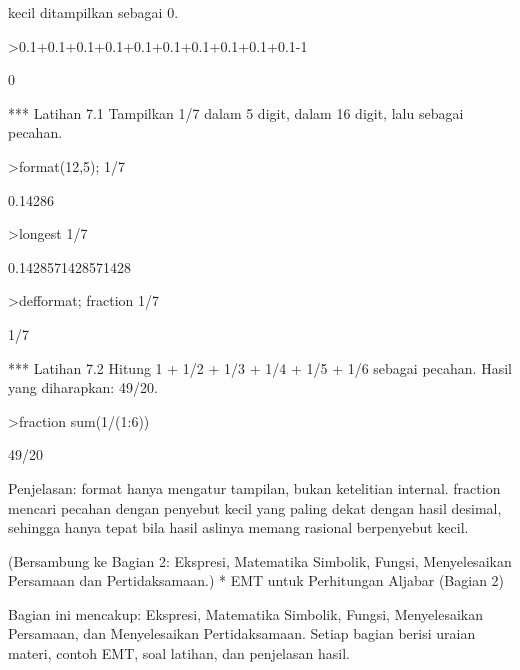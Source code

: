 \documentclass[a4paper,10pt]{article}
\begin{document}
\begin{eulernotebook}
\begin{eulercomment}
kecil ditampilkan sebagai 0.
\end{eulercomment}
\begin{eulerprompt}
>0.1+0.1+0.1+0.1+0.1+0.1+0.1+0.1+0.1+0.1-1
\end{eulerprompt}
\begin{euleroutput}
  0
\end{euleroutput}
\begin{eulercomment}
*** Latihan 7.1
Tampilkan 1/7 dalam 5 digit, dalam 16 digit, lalu sebagai pecahan.
\end{eulercomment}
\begin{eulerprompt}
>format(12,5); 1/7
\end{eulerprompt}
\begin{euleroutput}
      0.14286 
\end{euleroutput}
\begin{eulerprompt}
>longest 1/7
\end{eulerprompt}
\begin{euleroutput}
       0.1428571428571428 
\end{euleroutput}
\begin{eulerprompt}
>defformat; fraction 1/7
\end{eulerprompt}
\begin{euleroutput}
  1/7
\end{euleroutput}
\begin{eulercomment}
*** Latihan 7.2
Hitung 1 + 1/2 + 1/3 + 1/4 + 1/5 + 1/6 sebagai pecahan.
Hasil yang diharapkan: 49/20.
\end{eulercomment}
\begin{eulerprompt}
>fraction sum(1/(1:6))
\end{eulerprompt}
\begin{euleroutput}
  49/20
\end{euleroutput}
\begin{eulercomment}
Penjelasan: format hanya mengatur tampilan, bukan ketelitian internal.
fraction mencari pecahan dengan penyebut kecil yang paling dekat dengan
hasil desimal, sehingga hanya tepat bila hasil aslinya memang rasional
berpenyebut kecil.

(Bersambung ke Bagian 2: Ekspresi, Matematika Simbolik, Fungsi,
Menyelesaikan Persamaan dan Pertidaksamaan.)
* EMT untuk Perhitungan Aljabar (Bagian 2)

Bagian ini mencakup: Ekspresi, Matematika Simbolik, Fungsi, Menyelesaikan
Persamaan, dan Menyelesaikan Pertidaksamaan. Setiap bagian berisi uraian
materi, contoh EMT, soal latihan, dan penjelasan hasil.


\end{eulercomment}
\end{eulernotebook}
\end{document}

